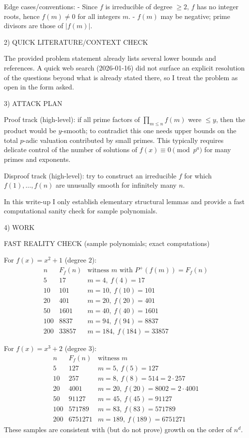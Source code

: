 Edge cases/conventions:
- Since $f$ is irreducible of degree $\ge 2$, $f$ has no integer roots, hence $f(m)\ne 0$ for all integers $m$.
- $f(m)$ may be negative; prime divisors are those of $|f(m)|$.

2) QUICK LITERATURE/CONTEXT CHECK

The provided problem statement already lists several lower bounds and references.
A quick web search (2026-01-16) did not surface an explicit resolution of the questions beyond what is already stated there, so I treat the problem as open in the form asked.

3) ATTACK PLAN

Proof track (high-level): if all prime factors of $\prod_{m\le n} f(m)$ were $\le y$, then the product would be $y$-smooth; to contradict this one needs upper bounds on the total $p$-adic valuation contributed by small primes. This typically requires delicate control of the number of solutions of $f(x)\equiv 0\pmod{p^a}$ for many primes and exponents.

Disproof track (high-level): try to construct an irreducible $f$ for which $f(1),\dots,f(n)$ are unusually smooth for infinitely many $n$.

In this write-up I only establish elementary structural lemmas and provide a fast computational sanity check for sample polynomials.

4) WORK

FAST REALITY CHECK (sample polynomials; exact computations)

For $f(x)=x^2+1$ (degree $2$):
\[
\begin{array}{c|c|c}
 n & F_f(n) & \text{witness }m\text{ with }P^+(f(m))=F_f(n)\\\hline
 5 & 17 & m=4,\ f(4)=17\\
 10 & 101 & m=10,\ f(10)=101\\
 20 & 401 & m=20,\ f(20)=401\\
 50 & 1601 & m=40,\ f(40)=1601\\
 100 & 8837 & m=94,\ f(94)=8837\\
 200 & 33857 & m=184,\ f(184)=33857
\end{array}
\]

For $f(x)=x^3+2$ (degree $3$):
\[
\begin{array}{c|c|c}
 n & F_f(n) & \text{witness }m\\\hline
 5 & 127 & m=5,\ f(5)=127\\
 10 & 257 & m=8,\ f(8)=514=2\cdot 257\\
 20 & 4001 & m=20,\ f(20)=8002=2\cdot 4001\\
 50 & 91127 & m=45,\ f(45)=91127\\
 100 & 571789 & m=83,\ f(83)=571789\\
 200 & 6751271 & m=189,\ f(189)=6751271
\end{array}
\]
These samples are consistent with (but do not prove) growth on the order of $n^d$.

